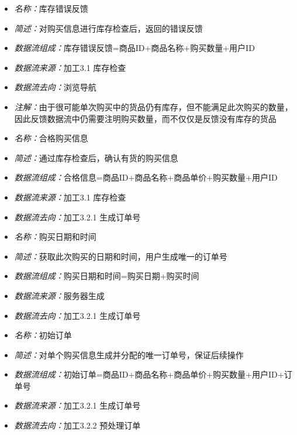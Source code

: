 \vspace{-1mm}

\begin{itemize}
	\item \textit{名称：}库存错误反馈
	\item \textit{简述：}对购买信息进行库存检查后，返回的错误反馈
	\item \textit{数据流组成：}库存错误反馈=商品ID+商品名称+购买数量+用户ID
	\item \textit{数据流来源：}加工3.1 库存检查
	\item \textit{数据流去向：}浏览导航
	\item \textit{注解：}由于很可能单次购买中的货品仍有库存，但不能满足此次购买的数量，因此反馈数据流中仍需要注明购买数量，而不仅仅是反馈没有库存的货品
\end{itemize}

\vspace{-1mm}

\begin{itemize}
	\item \textit{名称：}合格购买信息
	\item \textit{简述：}通过库存检查后，确认有货的购买信息
	\item \textit{数据流组成：}合格信息=商品ID+商品名称+商品单价+购买数量+用户ID
	\item \textit{数据流来源：}加工3.1 库存检查
	\item \textit{数据流去向：}加工3.2.1 生成订单号
\end{itemize}

\vspace{-1mm}

\begin{itemize}
	\item \textit{名称：}购买日期和时间
	\item \textit{简述：}获取此次购买的日期和时间，用户生成唯一的订单号
	\item \textit{数据流组成：}购买日期和时间=购买日期+购买时间
	\item \textit{数据流来源：}服务器生成
	\item \textit{数据流去向：}加工3.2.1 生成订单号
\end{itemize}

\vspace{-1mm}

\begin{itemize}
	\item \textit{名称：}初始订单
	\item \textit{简述：}对单个购买信息生成并分配的唯一订单号，保证后续操作
	\item \textit{数据流组成：}初始订单=商品ID+商品名称+商品单价+购买数量+用户ID+订单号
	\item \textit{数据流来源：}加工3.2.1 生成订单号
	\item \textit{数据流去向：}加工3.2.2 预处理订单
\end{itemize}

